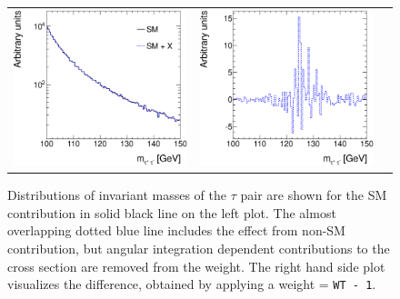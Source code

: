 \documentclass[12pt]{article}
\begin{document}
\begin{figure}[htp!]
\begin{tabular}{ccc}
  \includegraphics[width=0.48\columnwidth]{test2_tau_tau_mass.eps} &
  \includegraphics[width=0.48\columnwidth]{test2_tau_tau_mass_WT-1.eps} 
\end{tabular}
\caption{Distributions of invariant masses of the $\tau$ pair are shown for the SM contribution in solid black line on the left plot.
The almost overlapping dotted blue line includes the effect from non-SM contribution, 
but  angular integration dependent contributions to the cross section are removed from the weight. 
The right hand side plot visualizes the difference, obtained by applying a weight = {\tt WT - 1}.
\label{figTest2}}
\end{figure}
\end{document}
